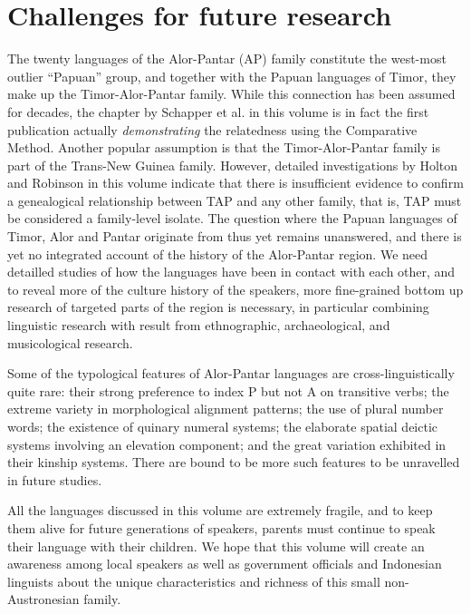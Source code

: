 \section{Challenges for future research}\label{sec:1:7}

The twenty languages of the Alor-Pantar (AP) family constitute the west-most outlier ``Papuan'' group, and together with the Papuan languages of Timor, they make up the Timor-Alor-Pantar family. While this connection has been assumed for decades, the chapter by Schapper et al. in this volume is in fact the first publication actually \textit{demonstrating} the relatedness using the Comparative Method. Another popular assumption is that the Timor-Alor-Pantar family is part of the Trans-New Guinea family. However, detailed investigations by Holton and Robinson in this volume indicate that there is insufficient evidence to confirm a genealogical relationship between TAP and any other family, that is, TAP must be considered a family-level isolate. The question where the Papuan languages of Timor, Alor and Pantar originate from thus yet remains unanswered, and there is yet no integrated account of the history of the Alor-Pantar region. We need detailled studies of how the languages have been in contact with each other, and to reveal more of the culture history of the speakers, more fine-grained bottom up research of targeted parts of the region is necessary, in particular combining linguistic research with result from ethnographic, archaeological, and musicological research. 

Some of the typological features of Alor-Pantar languages are cross-linguistically quite rare: their strong preference to index P but not A on transitive verbs; the extreme variety in morphological alignment patterns; the use of plural number words; the existence of quinary numeral systems; the elaborate spatial deictic systems involving an elevation component; and the great variation exhibited in their kinship systems. There are bound to be more such features to be unravelled in future studies.

All the languages discussed in this volume are extremely fragile, and to keep them alive for future generations of speakers, parents must continue to speak their language with their children. We hope that this volume will create an awareness among local speakers as well as government officials and Indonesian linguists about the unique characteristics and richness of this small non-Austronesian family.

